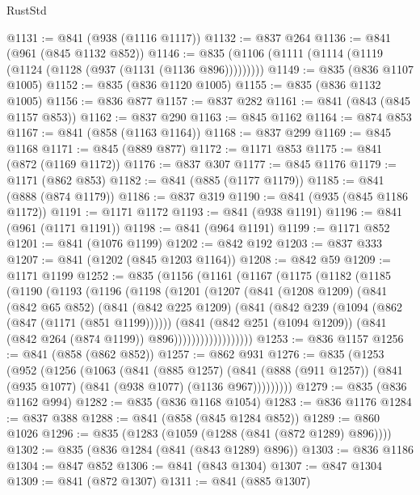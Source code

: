 \begin{lexlean}{RustStd}
\begin{coremodule}
{\begin{coremodule}
{{{{{{{{{{@1131 := @841 (@938 (@1116 @1117))
@1132 := @837 @264
@1136 := @841 (@961 (@845 @1132 @852))
@1146 := @835 (@1106 (@1111 (@1114 (@1119 (@1124 (@1128 (@937 (@1131 (@1136 @896)))))))))
@1149 := @835 (@836 @1107 @1005)
@1152 := @835 (@836 @1120 @1005)
@1155 := @835 (@836 @1132 @1005)
@1156 := @836 @877
@1157 := @837 @282
@1161 := @841 (@843 (@845 @1157 @853))
@1162 := @837 @290
@1163 := @845 @1162
@1164 := @874 @853
@1167 := @841 (@858 (@1163 @1164))
@1168 := @837 @299
@1169 := @845 @1168
@1171 := @845 (@889 @877)
@1172 := @1171 @853
@1175 := @841 (@872 (@1169 @1172))
@1176 := @837 @307
@1177 := @845 @1176
@1179 := @1171 (@862 @853)
@1182 := @841 (@885 (@1177 @1179))
@1185 := @841 (@888 (@874 @1179))
@1186 := @837 @319
@1190 := @841 (@935 (@845 @1186 @1172))
@1191 := @1171 @1172
@1193 := @841 (@938 @1191)
@1196 := @841 (@961 (@1171 @1191))
@1198 := @841 (@964 @1191)
@1199 := @1171 @852
@1201 := @841 (@1076 @1199)
@1202 := @842 @192
@1203 := @837 @333
@1207 := @841 (@1202 (@845 @1203 @1164))
@1208 := @842 @59
@1209 := @1171 @1199
@1252 := @835
    (@1156
      (@1161
        (@1167
          (@1175
            (@1182
              (@1185
                (@1190
                  (@1193
                    (@1196
                      (@1198
                        (@1201
                          (@1207
                            (@841
                              (@1208 @1209)
                              (@841
                                (@842 @65 @852)
                                (@841
                                  (@842 @225 @1209)
                                  (@841
                                    (@842 @239 (@1094 (@862 (@847 (@1171 (@851 @1199))))))
                                    (@841
                                      (@842 @251 (@1094 @1209))
                                      (@841 (@842 @264 (@874 @1199)) @896))))))))))))))))))
@1253 := @836 @1157
@1256 := @841 (@858 (@862 @852))
@1257 := @862 @931
@1276 := @835
    (@1253
      (@952
        (@1256
          (@1063
            (@841
              (@885 @1257)
              (@841 (@888 (@911 @1257)) (@841 (@935 @1077) (@841 (@938 @1077) (@1136 @967)))))))))
@1279 := @835 (@836 @1162 @994)
@1282 := @835 (@836 @1168 @1054)
@1283 := @836 @1176
@1284 := @837 @388
@1288 := @841 (@858 (@845 @1284 @852))
@1289 := @860 @1026
@1296 := @835 (@1283 (@1059 (@1288 (@841 (@872 @1289) @896))))
@1302 := @835 (@836 @1284 (@841 (@843 @1289) @896))
@1303 := @836 @1186
@1304 := @847 @852
@1306 := @841 (@843 @1304)
@1307 := @847 @1304
@1309 := @841 (@872 @1307)
@1311 := @841 (@885 @1307)
}}}}}}}}}}
\end{coremodule}}
\end{coremodule}
\end{lexlean}
